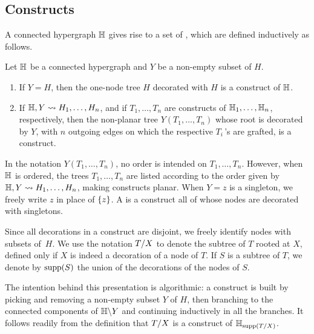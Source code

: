 
\subsection{Constructs}
A {connected} hypergraph ${\mathbb H}$ gives rise to a set of , which are defined inductively as follows.
 
\begin{definition} 
\label{inductive-construct}
Let ${\mathbb H}$ be a connected hypergraph and $Y$ be a non-empty subset of $H$.
\begin{enumerate}
\item  If $Y = H$, then the one-node tree $H$ decorated with $H$ is a construct of ${\mathbb H}$.
\item If ${\mathbb H},Y  \leadsto H_1,\ldots,H_n$, and if $T_1,\ldots,T_n$ are constructs of ${\mathbb H}_1,\ldots,{\mathbb H}_n$, respectively, then the
non-planar tree $Y(T_1,\ldots,T_n)$ whose root is decorated by $Y$, with $n$ outgoing edges on which the respective $T_i\,$'s are grafted, is a construct.  
\end{enumerate}
In the notation $Y(T_1,\ldots,T_n)$, no order is intended on  $T_1,\ldots,T_n$.
However, when ${\mathbb H}$ is ordered, the trees $T_1,\ldots,T_n$ are listed according to the order given by ${\mathbb H},Y  \leadsto H_1,\ldots,H_n$, making constructs planar.
When $Y={z}$ is a singleton, we freely write $z$ in place of $\left\{z\right\}$.
A  is a construct all of whose nodes are  decorated with singletons. 
\end{definition}


Since all decorations in a construct are disjoint, we freely identify nodes with subsets of~$H$. 
We use the notation $T/X$ to denote the  subtree of $T$ rooted at $X$, defined only if $X$ is indeed a decoration of a node of $T$. 
If $S$ is a subtree of $T$, we denote by $\mathrm{supp}(S)$ the union of the decorations of the nodes of $S$.

\begin{remark} \label{subconstruct-restriction}
The intention behind this presentation is algorithmic: a construct is built by picking and removing a non-empty subset $Y$ of $H$, then branching to the connected components of ${\mathbb H}\backslash Y$ and continuing inductively in all the branches.
It follows readily from the definition that $T/X$ is a construct of ${\mathbb H}_{\mathrm{supp}(T/X)}$.
\end{remark}

